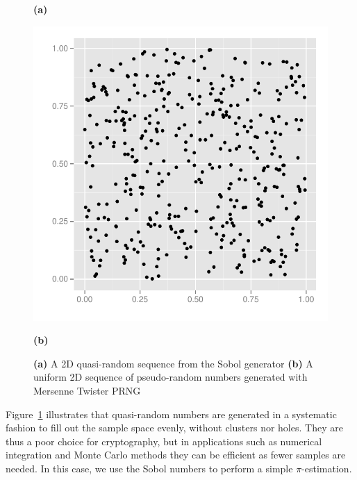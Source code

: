 \documentclass[preprint]{sigplanconf}
\begin{document}
\begin{figure}
\begin{minipage}{0.45\linewidth}
\begin{center}
      \hspace{0.55cm}\textbf{(a)}
    \end{center}
  \end{minipage}
  \begin{minipage}{0.45\linewidth}
    \begin{center}
      \includegraphics[width=\textwidth]{../report/graphics/2D-mersenne-sequence.pdf}

      \hspace{0.55cm}\textbf{(b)}
    \end{center}
  \end{minipage}

  \caption{\textbf{(a)} A 2D quasi-random sequence from the Sobol
    generator \textbf{(b)} A uniform 2D sequence of pseudo-random
    numbers generated with Mersenne Twister PRNG}
\label{fig:discrepancyplot}
\end{figure}
Figure~\ref{fig:discrepancyplot} illustrates that quasi-random numbers
are generated in a systematic fashion to fill out the sample space
evenly, without clusters nor holes. They are thus a poor choice for
cryptography, but in applications such as numerical integration and
Monte Carlo methods they can be efficient as fewer samples are
needed. In this case, we use the Sobol numbers to perform a simple
$\pi$-estimation.
\end{document}
